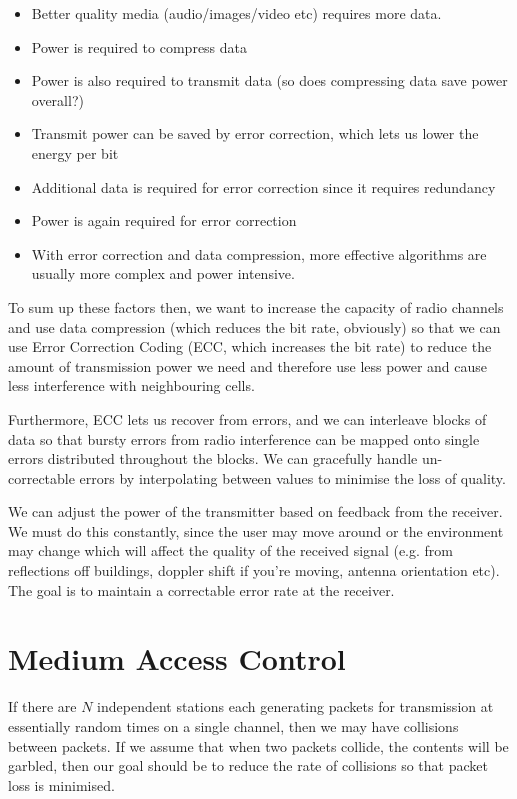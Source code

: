 \begin{mymulticols}
  \begin{itemize}
    \item Better quality media (audio/images/video etc) requires more data.
    \item Power is required to compress data
    \item Power is also required to transmit data (so does compressing data save
      power overall?)
    \item Transmit power can be saved by error correction, which lets us lower
      the energy per bit
    \item Additional data is required for error correction since it requires
      redundancy
    \item Power is again required for error correction
    \item With error correction and data compression, more effective algorithms
      are usually more complex and power intensive.
  \end{itemize}
\end{mymulticols}

To sum up these factors then, we want to increase the capacity of radio channels
and use data compression (which reduces the bit rate, obviously) so that we can
use Error Correction Coding (ECC, which increases the bit rate) to reduce the
amount of transmission power we need and therefore use less power and cause less
interference with neighbouring cells.

Furthermore, ECC lets us recover from errors, and we can interleave blocks of
data so that bursty errors from radio interference can be mapped onto single
errors distributed throughout the blocks. We can gracefully handle un-
correctable errors by interpolating between values to minimise the loss of
quality.

We can adjust the power of the transmitter based on feedback from the receiver.
We must do this constantly, since the user may move around or the environment
may change which will affect the quality of the received signal (e.g. from
reflections off buildings, doppler shift if you're moving, antenna orientation
etc). The goal is to maintain a correctable error rate at the receiver.


\section{Medium Access Control}

If there are $N$ independent stations each generating packets for transmission
at essentially random times on a single channel, then we may have collisions
between packets. If we assume that when two packets collide, the contents will
be garbled, then our goal should be to reduce the rate of collisions so that
packet loss is minimised.

